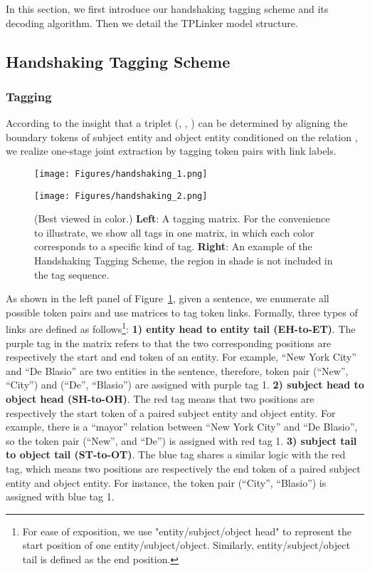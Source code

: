 \documentclass[11pt]{article}
\begin{document}
In this section, we first introduce our handshaking tagging scheme and its decoding algorithm.
Then we detail the TPLinker model structure.


\subsection{Handshaking Tagging Scheme}
\subsubsection{Tagging}
According to the insight that a triplet (, , ) can be determined by aligning the boundary tokens of subject entity  and object entity  conditioned on the relation , we realize one-stage joint extraction by tagging token pairs with link labels.

\begin{figure}[t]
\centering 
\begin{minipage}[t]{0.48\textwidth}
    \texttt{[image: Figures/handshaking\_1.png]}
\end{minipage}\begin{minipage}[t]{0.48\textwidth}
    \texttt{[image: Figures/handshaking\_2.png]}
\end{minipage}
 \caption{(Best viewed in color.) \textbf{Left}:  A tagging matrix. For the convenience to illustrate, we show all tags in one matrix, in which each color corresponds to a specific kind of tag. \textbf{Right}: An example of the Handshaking Tagging Scheme, the region in shade is not included in the tag sequence. }
 \label{fig:handshaking_tagging}
\end{figure}
As shown in the left panel of Figure~\ref{fig:handshaking_tagging}, given a sentence, we enumerate all possible token pairs and use matrices to tag token links. Formally, three types of links are defined as follows\footnote{For ease of exposition, we use "entity/subject/object head" to represent the start position of one entity/subject/object. Similarly, entity/subject/object tail is defined as the end position.}:
\textbf{1) entity head to entity tail (EH-to-ET)}. The purple tag in the matrix refers to that the two corresponding positions are respectively the start and end token of an entity. For example, ``New York City'' and ``De Blasio'' are two entities in the sentence, therefore, token pair (``New'', ``City'') and (``De'', ``Blasio'') are assigned with purple tag 1.
\textbf{2) subject head to object head  (SH-to-OH)}. The red tag means that two positions are respectively the start token of a paired subject entity and object entity. For example, there is a ``mayor'' relation between ``New York City'' and ``De Blasio'', so the token pair (``New'', and ``De'') is assigned with red tag 1.
\textbf{3) subject tail to object tail  (ST-to-OT)}. The blue tag shares a similar logic with the red tag, which means two positions are respectively the end token of a paired subject entity and object entity. For instance, the token pair (``City'', ``Blasio'') is assigned with blue tag 1.
\end{document}
